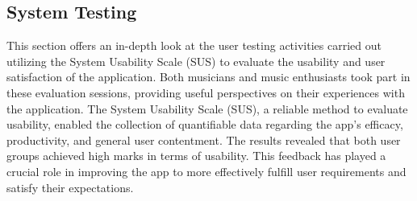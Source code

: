 \subsection{System Testing}
This section offers an in-depth look at the user testing activities carried out utilizing the System Usability Scale (SUS) to evaluate the usability and user satisfaction of the application. Both musicians and music enthusiasts took part in these evaluation sessions, providing useful perspectives on their experiences with the application. The System Usability Scale (SUS), a reliable method to evaluate usability, enabled the collection of quantifiable data regarding the app's efficacy, productivity, and general user contentment. The results revealed that both user groups achieved high marks in terms of usability. This feedback has played a crucial role in improving the app to more effectively fulfill user requirements and satisfy their expectations.

